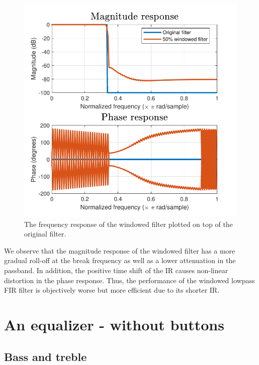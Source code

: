 \documentclass[journal]{IEEEtran}
\begin{document}
\begin{figure}[H]
    \centering
    \includegraphics[width=\columnwidth,clip]{assignment_02/plots/freq_resp_lowpass_fir_window.pdf}
    \caption{The frequency response of the windowed filter plotted on top of the original filter.}
    \label{fig:freq_resp_lowpass_window}
\end{figure}
We observe that the magnitude response of the windowed filter has a more gradual roll-off at the break frequency as well as a lower attenuation in the passband. In addition, the positive time shift of the IR causes non-linear distortion in the phase response. Thus, the performance of the windowed lowpass FIR filter is objectively worse but more efficient due to its shorter IR. 
\newpage

\section{An equalizer - without buttons}
\subsection{Bass and treble}
\end{document}
